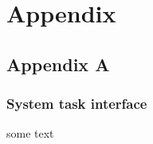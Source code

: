 
\chapter{Appendix}
\section{Appendix A}

\subsection{System task interface}
some text
    
    
    
    